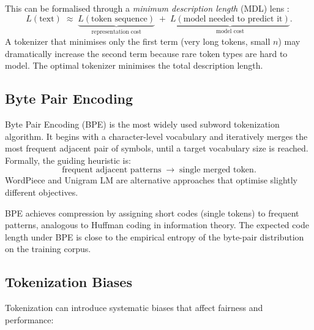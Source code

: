 \documentclass[11pt,a4paper]{article}
\theoremstyle{definition}
\theoremstyle{plain}
\begin{document}
This can be formalised through a \emph{minimum description length} (MDL) lens \cite{grunwald2007mdl}:
\[
  L(\text{text})
  \;\approx\;
  \underbrace{L(\text{token sequence})}_{\text{representation cost}}
  \;+\;
  \underbrace{L(\text{model needed to predict it})}_{\text{model cost}}.
\]
A tokenizer that minimises only the first term (very long tokens, small $n$)
may dramatically increase the second term because rare token types are hard to model.
The optimal tokenizer minimises the total description length.

\subsection{Byte Pair Encoding}

Byte Pair Encoding (BPE) \cite{sennrich2016bpe} is the most widely used subword
tokenization algorithm.
It begins with a character-level vocabulary and iteratively merges the most frequent
adjacent pair of symbols, until a target vocabulary size is reached.
Formally, the guiding heuristic is:
\[
  \text{frequent adjacent patterns} \;\longrightarrow\; \text{single merged token}.
\]
WordPiece \cite{schuster2012wordpiece} and Unigram LM \cite{kudo2018sentencepiece}
are alternative approaches that optimise slightly different objectives.

\begin{keyresult}
BPE achieves compression by assigning short codes (single tokens) to frequent patterns,
analogous to Huffman coding in information theory.
The expected code length under BPE is close to the empirical entropy of the
byte-pair distribution on the training corpus.
\end{keyresult}

\subsection{Tokenization Biases}

Tokenization can introduce systematic biases that affect fairness and performance:
\end{document}

